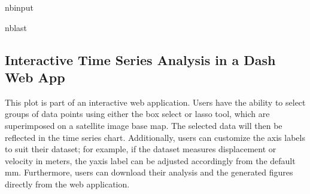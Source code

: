 \documentclass[letterpaper,10pt,english]{sphinxmanual}
\begin{document}
\begin{sphinxuseclass}{nbinput}
\begin{sphinxuseclass}{nblast}
{\begin{sphinxVerbatim}[commandchars=\\\{\}]
                                        
                                        
                                       \PYG{p}{[} \PYG{p}{]} 
                                        
\end{sphinxVerbatim}
}

\end{sphinxuseclass}
\end{sphinxuseclass}

\subsection{Interactive Time Series Analysis in a Dash Web App}
\label{\detokenize{notebooks/RockGlacier_optical:Interactive-Time-Series-Analysis-in-a-Dash-Web-App}}
\sphinxAtStartPar
This plot is part of an interactive web application. Users have the ability to select groups of data points using either the box select or lasso tool, which are superimposed on a satellite image base map. The selected data will then be reflected in the time series chart. Additionally, users can customize the axis labels to suit their dataset; for example, if the dataset measures displacement or velocity in meters, the y\sphinxhyphen{}axis label can be adjusted accordingly from the default mm. Furthermore,
users can download their analysis and the generated figures directly from the web application.
\end{document}
